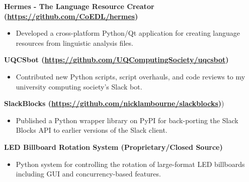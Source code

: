 \documentclass[a4paper]{article}
\newenvironment{singleitem}
{   \small
    \vspace{0pt}
    \begin{itemize}
    \setlength{\itemsep}{0pt}
    \setlength{\parskip}{0pt}
    \setlength{\parsep}{0pt}   }
{\end{itemize} \vspace{1pt}	}
\begin{document}
\textbf{{Hermes - The Language Resource Creator} (\href{https://github.com/CoEDL/hermes}{https://github.com/CoEDL/hermes})}
\begin{singleitem}
	\item Developed a cross-platform Python/Qt application for creating language resources from linguistic analysis files.
\end{singleitem}


\textbf{UQCSbot (\href{https://github.com/UQComputingSociety/uqcsbot}{https://github.com/UQComputingSociety/uqcsbot})}
\begin{singleitem}
	\item Contributed new Python scripts, script overhauls, and code reviews to my university computing society's Slack bot.
\end{singleitem}

\textbf{SlackBlocks (\href{https://github.com/nicklambourne/slackblocks}{https://github.com/nicklambourne/slackblocks})})
\begin{singleitem}
	\item Published a Python wrapper library on PyPI for back-porting the Slack Blocks API to earlier versions of the Slack client.
\end{singleitem}

\textbf{LED Billboard Rotation System (Proprietary/Closed Source)}
\begin{singleitem}
	\item Python system for controlling the rotation of large-format LED billboards including GUI and concurrency-based features.
\end{singleitem}

\vspace{1mm}
\end{document}
